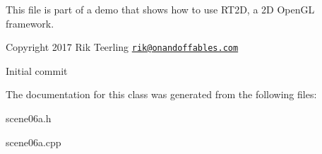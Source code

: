 This file is part of a demo that shows how to use R\+T2D, a 2D Open\+GL framework.


\begin{DoxyItemize}
\item Copyright 2017 Rik Teerling \href{mailto:rik@onandoffables.com}{\tt rik@onandoffables.\+com}
\begin{DoxyItemize}
\item Initial commit 
\end{DoxyItemize}
\end{DoxyItemize}

The documentation for this class was generated from the following files\+:\begin{DoxyCompactItemize}
\item 
scene06a.\+h\item 
scene06a.\+cpp\end{DoxyCompactItemize}
